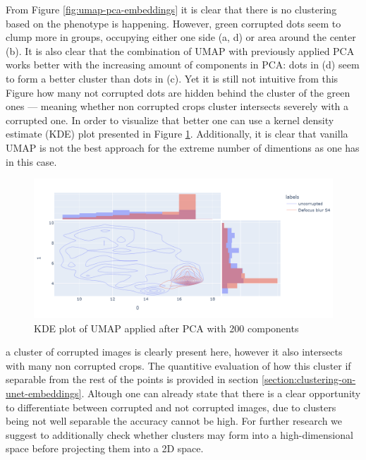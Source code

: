 From Figure \ref{fig:umap-pca-embeddings} it is clear that there is no clustering based on the phenotype is happening. However, green corrupted dots seem to clump more in groups, occupying either one side (a, d) or area around the center (b). It is also clear that the combination of UMAP with previously applied PCA works better with the increasing amount of components in PCA: dots in (d) seem to form a better cluster than dots in (c). Yet it is still not intuitive from this Figure how many not corrupted dots are hidden behind the cluster of the green ones --- meaning whether non corrupted crops cluster intersects severely with a corrupted one. In order to visualize that better one can use a kernel density estimate (KDE) plot presented in Figure \ref{fig:kde}. Additionally, it is clear that vanilla UMAP is not the best approach for the extreme number of dimentions as one has in this case.

\begin{figure}[htb]
	\begin{center}
		\includegraphics[width=\linewidth]{bilder/unet-embeddings/kde.png}
	\caption{KDE plot of UMAP applied after PCA with 200 components}\label{fig:kde}
	\end{center}
\end{figure}

a cluster of corrupted images is clearly present here, however it also intersects with many non corrupted crops. The quantitive evaluation of how this cluster if separable from the rest of the points is provided in section \ref{section:clustering-on-unet-embeddings}. Altough one can already state that there is a clear opportunity to differentiate between corrupted and not corrupted images, due to clusters being not well separable the accuracy cannot be high. For further research we suggest to additionally check whether clusters may form into a high-dimensional space before projecting them into a 2D space.
